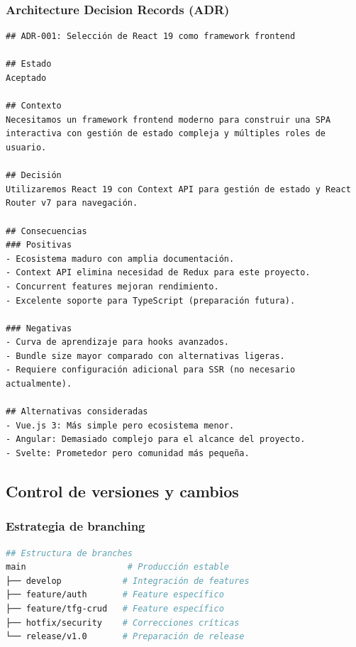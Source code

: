 \documentclass[12pt,a4paper,oneside]{report}
\begin{document}
\subsubsection{Architecture Decision Records
(ADR)}\label{architecture-decision-records-adr}

\begin{lstlisting}
## ADR-001: Selección de React 19 como framework frontend

## Estado
Aceptado

## Contexto
Necesitamos un framework frontend moderno para construir una SPA interactiva con gestión de estado compleja y múltiples roles de usuario.

## Decisión
Utilizaremos React 19 con Context API para gestión de estado y React Router v7 para navegación.

## Consecuencias
### Positivas
- Ecosistema maduro con amplia documentación.
- Context API elimina necesidad de Redux para este proyecto.
- Concurrent features mejoran rendimiento.
- Excelente soporte para TypeScript (preparación futura).

### Negativas
- Curva de aprendizaje para hooks avanzados.
- Bundle size mayor comparado con alternativas ligeras.
- Requiere configuración adicional para SSR (no necesario actualmente).

## Alternativas consideradas
- Vue.js 3: Más simple pero ecosistema menor.
- Angular: Demasiado complejo para el alcance del proyecto.
- Svelte: Prometedor pero comunidad más pequeña.
\end{lstlisting}

\subsection{Control de versiones y
cambios}\label{control-de-versiones-y-cambios}

\subsubsection{Estrategia de branching}\label{estrategia-de-branching}

\begin{lstlisting}[language=bash]
## Estructura de branches
main                    # Producción estable
├── develop            # Integración de features
├── feature/auth       # Feature específico
├── feature/tfg-crud   # Feature específico
├── hotfix/security    # Correcciones críticas
└── release/v1.0       # Preparación de release
\end{lstlisting}
\end{document}

